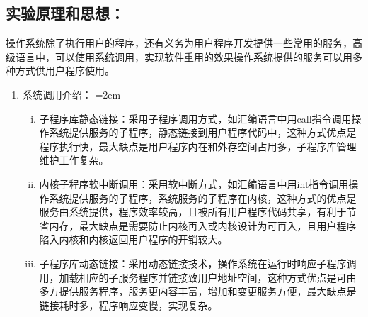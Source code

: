 \documentclass[UTF8]{article}
\begin{document}
\subsection{实验原理和思想：}
操作系统除了执行用户的程序，还有义务为用户程序开发提供一些常用的服务，高级语言中，可以使用系统调用，实现软件重用的效果操作系统提供的服务可以用多种方式供用户程序使用。
\begin{enumerate}[1)]
\heiti
	\item 系统调用介绍：
	\parindent=2em
		\begin{enumerate}[i)]
		\heiti \setlength{\itemsep}{0.2ex}
			\item 子程序库静态链接：采用子程序调用方式，如汇编语言中用call指令调用操作系统提供服务的子程序，静态链接到用户程序代码中，这种方式优点是程序执行快，最大缺点是用户程序内在和外存空间占用多，子程序库管理维护工作复杂。
			\item 内核子程序软中断调用：采用软中断方式，如汇编语言中用int指令调用操作系统提供服务的子程序，系统服务的子程序在内核，这种方式的优点是服务由系统提供，程序效率较高，且被所有用户程序代码共享，有利于节省内存，最大缺点是需要防止内核再入或内核设计为可再入，且用户程序陷入内核和内核返回用户程序的开销较大。
			\item 子程序库动态链接：采用动态链接技术，操作系统在运行时响应子程序调用，加载相应的子服务程序并链接致用户地址空间，这种方式优点是可由多方提供服务程序，服务更内容丰富，增加和变更服务方便，最大缺点是链接耗时多，程序响应变慢，实现复杂。
		\end{enumerate}
		

\end{enumerate}
\end{document}
